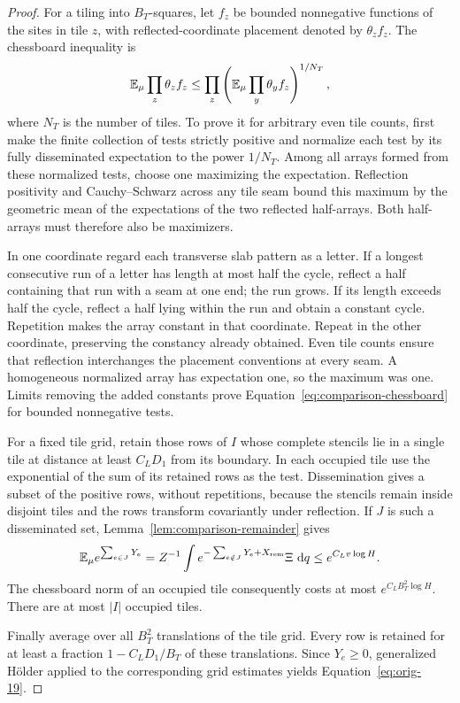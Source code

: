 \begin{proof}
For a tiling into $B_T$-squares, let $f_z$ be bounded nonnegative
functions of the sites in tile $z$, with reflected-coordinate
placement denoted by $\theta_zf_z$. The chessboard inequality is
\begin{equation}
 \mathbb E_\mu\prod_z\theta_zf_z
 \le\prod_z
 \left(\mathbb E_\mu\prod_y\theta_y f_z\right)^{1/N_T},
 \label{eq:comparison-chessboard}
\end{equation}
where $N_T$ is the number of tiles. To prove it for arbitrary even
tile counts, first make the finite collection of tests strictly
positive and normalize each test by its fully disseminated
expectation to the power $1/N_T$. Among all arrays formed from these
normalized tests, choose one maximizing the expectation. Reflection
positivity and Cauchy--Schwarz across any tile seam bound this maximum
by the geometric mean of the expectations of the two reflected
half-arrays. Both half-arrays must therefore also be maximizers.

In one coordinate regard each transverse slab pattern as a letter.
If a longest consecutive run of a letter has length at most half
the cycle, reflect a half containing that run with a seam at one end;
the run grows. If its length exceeds half the cycle, reflect a half
lying within the run and obtain a constant cycle. Repetition makes
the array constant in that coordinate. Repeat in the other
coordinate, preserving the constancy already obtained. Even tile
counts ensure that reflection interchanges the placement conventions
at every seam. A homogeneous normalized array has expectation one,
so the maximum was one. Limits removing the added constants prove
Equation~\eqref{eq:comparison-chessboard} for bounded nonnegative tests.

For a fixed tile grid, retain those rows of $I$ whose complete stencils
lie in a single tile at distance at least $C_LD_1$ from its boundary.
In each occupied tile use the exponential of the sum of its retained
rows as the test. Dissemination gives a subset of the positive rows,
without repetitions, because the stencils remain inside disjoint tiles
and the rows transform covariantly under reflection. If $J$ is such
a disseminated set, Lemma~\ref{lem:comparison-remainder} gives
\[
 \mathbb E_\mu e^{\sum_{e\in J}Y_e}
 =Z^{-1}\int
 e^{-\sum_{e\notin J}Y_e+X_{\mathrm{rem}}}\Xi\,\,\mathrm d q
 \le e^{C_Lv\log H}.
\]
The chessboard norm of an occupied tile consequently costs at most
$e^{C_LB_T^2\log H}$. There are at most $|I|$ occupied tiles.

Finally average over all $B_T^2$ translations of the tile grid.
Every row is retained for at least a fraction
$1-C_LD_1/B_T$ of these translations. Since $Y_e\ge0$, generalized
Hölder applied to the corresponding grid estimates yields
Equation~\eqref{eq:orig-19}.
\end{proof}

